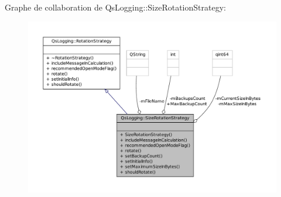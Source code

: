 Graphe de collaboration de Qs\-Logging\-:\-:Size\-Rotation\-Strategy\-:
\nopagebreak
\begin{figure}[H]
\begin{center}
\leavevmode
\includegraphics[width=350pt]{classQsLogging_1_1SizeRotationStrategy__coll__graph}
\end{center}
\end{figure}
